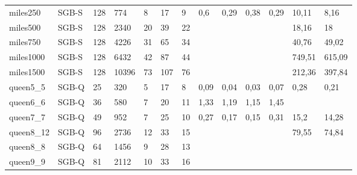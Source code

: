 \documentclass{sig-alternate}
\begin{document}
\begin{table*}[b]
{\begin{tabular}{lllllllllllll}
miles250 & SGB-S & 128 & 774 & 8 & 17 & 9 & 0,6 & 0,29 & 0,38 & 0,29 & 10,11 & 8,16 \\
miles500 & SGB-S & 128 & 2340 & 20 & 39 & 22 &  &  &  &  & 18,16 & 18 \\
miles750 & SGB-S & 128 & 4226 & 31 & 65 & 34 &  &  &  &  & 40,76 & 49,02 \\
miles1000 & SGB-S & 128 & 6432 & 42 & 87 & 44 &  &  &  &  & 749,51 & 615,09 \\
miles1500 & SGB-S & 128 & 10396 & 73 & 107 & 76 &  &  &  &  & 212,36 & 397,84 \\
queen5\_5 & SGB-Q & 25 & 320 & 5 & 17 & 8 & 0,09 & 0,04 & 0,03 & 0,07 & 0,28 & 0,21 \\
queen6\_6 & SGB-Q & 36 & 580 & 7 & 20 & 11 & 1,33 & 1,19 & 1,15 & 1,45 &  &  \\
queen7\_7 & SGB-Q & 49 & 952 & 7 & 25 & 10 & 0,27 & 0,17 & 0,15 & 0,31 & 15,2 & 14,28 \\
queen8\_12 & SGB-Q & 96 & 2736 & 12 & 33 & 15 &  &  &  &  & 79,55 & 74,84 \\
queen8\_8 & SGB-Q & 64 & 1456 & 9 & 28 & 13 &  &  &  &  &  &  \\
queen9\_9 & SGB-Q & 81 & 2112 & 10 & 33 & 16 &  &  &  &  &  & 
\end{tabular}
}
\end{table*}
\end{document}
